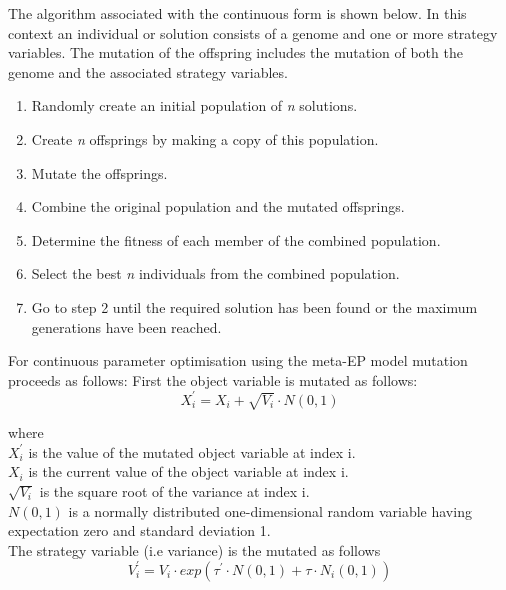 \label{strategy_variables}The algorithm associated with the continuous form is shown below. In this context an individual or solution consists of a genome and one or more strategy variables. The mutation of the offspring includes the mutation of both the genome and the associated strategy variables.

\begin{center}
\begin{enumerate}
\item Randomly create an initial population of \emph{n} solutions.
\item Create \emph{n} offsprings by making a copy of this population.
\item Mutate the offsprings.
\item Combine the original population and the mutated offsprings.
\item Determine the fitness of each member of the combined population. 
\item Select the best \emph{n} individuals from the combined population.
\item Go to step 2 until the required solution has been found or the maximum generations  have been reached. 
\end{enumerate}
\end{center}

For continuous parameter optimisation using the meta-EP model mutation  proceeds as follows:
First the object variable is mutated as follows:
\begin{displaymath}
X_i^{'} = X_i + \sqrt{V_i}\cdot N(0,1)
\end{displaymath}


where \\
$X^{'}_i$ is the value of the mutated object variable at index i. \\
$X_i$ is the current value of the object variable at index i. \\
$\sqrt{V_i}$ is the square root of the variance at index i. \\
$N(0,1)$ is a normally distributed one-dimensional random variable having expectation zero and standard deviation 1. \\


The strategy variable (i.e variance) is the mutated as follows
\begin{displaymath}
V_i^{'} = V_i\cdot exp(\tau^{'}\cdot N(0,1) + \tau\cdot N_i(0,1))
\end{displaymath}


